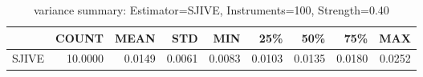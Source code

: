 \begin{table}[ht]
\centering
\caption{variance summary: Estimator=SJIVE, Instruments=100, Strength=0.40}
\begin{tabular}{lrrrrrrrr}
\toprule
 & COUNT & MEAN & STD & MIN & 25\% & 50\% & 75\% & MAX \\
\midrule
SJIVE & 10.0000 & 0.0149 & 0.0061 & 0.0083 & 0.0103 & 0.0135 & 0.0180 & 0.0252 \\
\bottomrule
\end{tabular}
\end{table}
